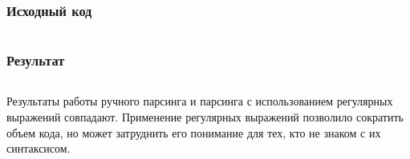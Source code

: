 \subsubsection{Исходный код}
\inputminted[breaklines]{python}{../task_3.py}

\subsubsection{Результат}
\inputminted[breaklines]{js}{../schedule_3.json}
Результаты работы ручного парсинга и парсинга с использованием регулярных выражений совпадают. Применение регулярных выражений позволило сократить объем кода, но может затруднить его понимание для тех, кто не знаком с их синтаксисом.